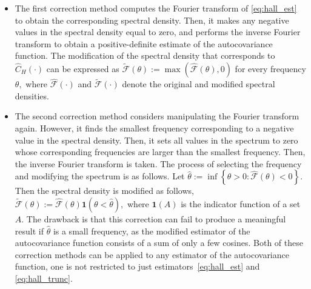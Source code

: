 \begin{itemize}
\item[(i)] \label{make_pos_def_1}
The first correction method computes the Fourier transform of \eqref{eq:hall_est} to obtain the corresponding spectral density. Then, it makes any negative values in the spectral density equal to zero, and performs the inverse Fourier transform to obtain a positive-definite estimate of the autocovariance function.
The modification of the spectral density that corresponds to \(\widehat{C}_{H}(\cdot)\) can be expressed as \( \widetilde{\mathcal{F}}(\theta) := \max(\widehat{\mathcal{F}}(\theta), 0) \)
for every frequency \(\theta ,\) where \(\widehat{\mathcal{F}}( \cdot ) \) and \(\widetilde{\mathcal{F}} ( \cdot ) \) denote the original and modified spectral densities.

\item[(ii)]
\label{make_pos_def_2}
The second correction method considers manipulating the Fourier transform again. However, it finds the smallest frequency corresponding to a negative value in the spectral density. Then, it sets all values in the spectrum to zero whose corresponding frequencies are larger than the smallest frequency. Then, the inverse Fourier transform is taken.
The process of selecting the frequency and modifying the spectrum is as follows. Let \( \widehat{\theta} := \inf \left\{ \theta > 0 : \widehat{\mathcal{F}} \left( \theta \right) < 0 \right\}.\)  Then the spectral density is modified as follows, \( \widetilde{\mathcal{F}}(\theta) := \widehat{\mathcal{F}}(
\theta)\bm{1}\left(\theta < \widehat{\theta}\right), \) where \(\bm{1}(A)\) is the indicator function of a set \(A.\)
The drawback is that this correction can fail to produce a meaningful result if \(\widehat{\theta}\) is a small frequency, as the modified estimator of the autocovariance function consists of a sum of only a few cosines.
Both of these correction methods can be applied to any estimator of the autocovariance function, one is not restricted to just estimators~\eqref{eq:hall_est} and \eqref{eq:hall_trunc}.

\end{itemize}

